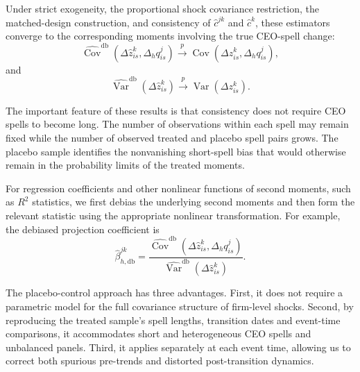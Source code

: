 \documentclass[sigconf,nonacm]{acmart}
\begin{document}
Under strict exogeneity, the proportional shock covariance restriction,
the matched-design construction, and consistency of $\widehat c^{jk}$ and $\widehat c^{k}$,
these estimators converge to the corresponding moments involving the
true CEO-spell change:
\begin{equation}
\widehat{\operatorname{Cov}}^{\mathrm{db}}\!\left(
\Delta\widehat z_{is}^{k},
\Delta_h q_{is}^{j}
\right)
\overset{p}{\longrightarrow}
\operatorname{Cov}\!\left(
\Delta z_{is}^{k},
\Delta_h q_{is}^{j}
\right),
\label{eq:debiased_covariance_plim}
\end{equation}
and
\begin{equation}
\widehat{\operatorname{Var}}^{\mathrm{db}}\!\left(
\Delta\widehat z_{is}^{k}
\right)
\overset{p}{\longrightarrow}
\operatorname{Var}\!\left(
\Delta z_{is}^{k}
\right).
\label{eq:debiased_variance_plim}
\end{equation}

The important feature of these results is that consistency does not
require CEO spells to become long. The number of observations within
each spell may remain fixed while the number of observed treated and
placebo spell pairs grows. The placebo sample identifies the
nonvanishing short-spell bias that would otherwise remain in the
probability limits of the treated moments.

For regression coefficients and other nonlinear functions of second
moments, such as $R^2$ statistics, we first debias the underlying second moments and then form the
relevant statistic using the appropriate nonlinear transformation. For example, the debiased projection coefficient is
\begin{equation}
\widehat\beta_{h,\mathrm{db}}^{jk}
=
\frac{
\widehat{\operatorname{Cov}}^{\mathrm{db}}\!\left(
\Delta\widehat z_{is}^{k},
\Delta_h q_{is}^{j}
\right)
}{
\widehat{\operatorname{Var}}^{\mathrm{db}}\!\left(
\Delta\widehat z_{is}^{k}
\right)
}.
\label{eq:debiased_beta}
\end{equation}


The placebo-control approach has three advantages. First, it does not
require a parametric model for the full covariance structure of
firm-level shocks. Second, by reproducing the treated sample's spell
lengths, transition dates and event-time comparisons, it accommodates short and heterogeneous CEO spells and
unbalanced panels. Third, it applies separately at each event time,
allowing us to correct both spurious pre-trends and distorted
post-transition dynamics.
\end{document}
